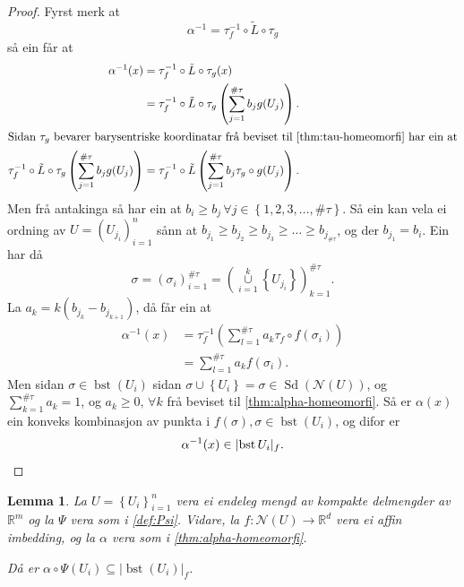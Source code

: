 \documentclass[a4paper, 12pt, norsk]{article}
\theoremstyle{plain}
\newtheorem{lemma}[theorem]{Lemma}
\theoremstyle{definition}
\newcommand{\Rb}{\mathbb{R}}
\newcommand{\Nc}{\mathcal{N}}
\newcommand{\union}{ \mathop{\cup}\limits }
\newcommand{\gr}[1]{ \lvert #1 \rvert } %
\newcommand{\set}[1]{ \left\{ #1 \right\} } %
\newcommand{\tuple}[1]{ \left( #1 \right) } %
\DeclareMathOperator{\Sd}{Sd} %
\DeclareMathOperator{\bst}{bst} %
\begin{document}
\begin{proof}
	Fyrst merk at
	\[
		\alpha^{-1} = \tau_f^{-1} \circ \tilde{L} \circ \tau_g
	\]
	så ein får at
	\begin{align*}
		\alpha^{-1}(x) &= \tau_f^{-1} \circ \tilde{L} \circ \tau_g (x) \\
		&= \tau_f^{-1} \circ \tilde{L} \circ \tau_g \tuple{\sum_{j=1}^{\#\tau} b_j g(U_j)}. \\
		\intertext{Sidan \( \tau_g \) bevarer barysentriske koordinatar frå beviset til \autoref{thm:tau-homeomorfi} har ein at}
		\tau_f^{-1} \circ \tilde{L} \circ \tau_g \tuple{\sum_{j=1}^{\#\tau} b_j g(U_j)} &= \tau_f^{-1} \circ \tilde{L} \tuple{\sum_{j=1}^{\#\tau} b_j \tau_g \circ g(U_j)}.
	\end{align*}
	Men frå antakinga så har ein at \( b_i \geq b_j \, \forall j \in \set{1, 2, 3, \dots, \#\tau} \). Så ein kan vela ei ordning av \( U = \tuple{U_{j_i}}_{i=1}^n \) sånn at \( b_{j_1} \geq b_{j_2} \geq b_{j_3} \geq \dots \geq b_{j_{\#\tau}} \), og der \( b_{j_1}=b_i \). Ein har då 
	\[
		\sigma = \tuple{\sigma_i}_{i=1}^{\#\tau} = \tuple{\union_{i=1}^k \set{U_{j_i}}}_{k=1}^{\#\tau}.
	\]
	La \( a_k = k\tuple{b_{j_k}-b_{j_{k+1}}} \), då får ein at
	\begin{align*}
		\alpha^{-1}(x) &= \tau_f^{-1} \tuple{\sum_{l=1}^{\#\tau}a_k \tau_f \circ f(\sigma_i)} \\
		&= \sum_{l=1}^{\#\tau} a_k f(\sigma_i).
	\end{align*}
	Men sidan \( \sigma \in \bst(U_i) \) sidan \( \sigma \union \set{U_i} = \sigma \in \Sd(\Nc(U)) \), og \( \sum_{k=1}^{\#\tau} a_k = 1 \), og \( a_k \geq 0, \, \forall k \) frå beviset til \autoref{thm:alpha-homeomorfi}. Så er \( \alpha(x) \) ein konveks kombinasjon av punkta i \( f(\sigma), \sigma \in \bst(U_i) \), og difor er
	\[
		\alpha^{-1}(x) \in \gr{\bst{U_i}}_f. \qedhere
	\]
\end{proof}

\begin{lemma} \label{thm:Psi-inni-bst}
	La \( U = \set{U_i}_{i=1}^n \) vera ei endeleg mengd av kompakte delmengder av \( \Rb^m \) og la \( \Psi \) vera som i \autoref{def:Psi}. Vidare, la \( f: \Nc(U) \to \Rb^d \) vera ei affin imbedding, og la \( \alpha \) vera som i \autoref{thm:alpha-homeomorfi}.

	Då er \( \alpha \circ \Psi(U_i) \subseteq \gr{\bst(U_i)}_f \).
\end{lemma}
\end{document}
